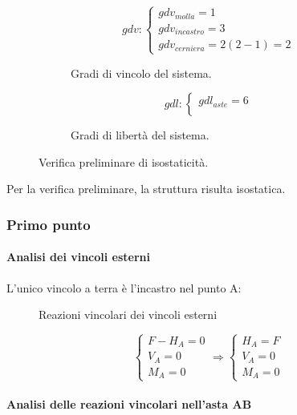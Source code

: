 \documentclass[main.tex]{subfiles}
\begin{document}
\begin{figure}[H]
  \begin{subfigure}[b]{.5\textwidth}
  \centering
  \[
  	gdv: \begin{cases}
		gdv_{molla} = 1\\
		gdv_{incastro} = 3\\
		gdv_{cerniera} = 2(2-1) = 2
  	\end{cases}
  \]
  \caption{Gradi di vincolo del sistema.}
  \end{subfigure}
  \hfill
  \begin{subfigure}[b]{.5\textwidth}
  \centering
  \[
  	gdl: \begin{cases}
  		gdl_{aste} = 6\\
  	\end{cases}  
  \]
  \caption{Gradi di libertà del sistema.}
  \end{subfigure}
  \caption{Verifica preliminare di isostaticità.}
\end{figure}

Per la verifica preliminare, la struttura risulta isostatica.

\subsubsection{Primo punto}

\paragraph{Analisi dei vincoli esterni}
L'unico vincolo a terra è l'incastro nel punto A:

\begin{figure}[H]
\centering
\resizebox{.5\textwidth}{!}{}
\caption{Reazioni vincolari dei vincoli esterni}
\end{figure}

\[
\begin{cases}
	F - H_A = 0 \\
	V_A = 0 \\
	M_A = 0	
\end{cases}
\Longrightarrow
\begin{cases}
	H_A = F \\
	V_A = 0 \\
	M_A = 0	
\end{cases}
\]

\paragraph{Analisi delle reazioni vincolari nell'asta AB}
\end{document}
